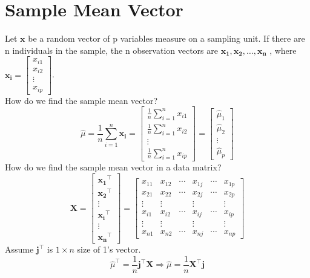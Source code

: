 \documentclass{article}
\begin{document}
\section{Sample Mean Vector}
Let $\mathbf{x}$ be a random vector of p variables measure on a sampling unit. If there are n individuals in the sample, the n observation vectors are $\mathbf{x_1, x_2, \hdots, x_n}$ , where $\mathbf{x_i}=\begin{bmatrix}x_{i1}\\ x_{i2}\\ \vdots \\ x_{ip} \end{bmatrix}$.\\
How do we find the sample mean vector?
\[\hat{\mu}=\frac{1}{n}\sum^n_{i=1}\mathbf{x_i}=
\begin{bmatrix}
\frac{1}{n}\sum^n_{i=1}x_{i1}\\ 
\frac{1}{n}\sum^n_{i=1}x_{i2}\\ 
\vdots \\ 
\frac{1}{n}\sum^n_{i=1}x_{ip}
\end{bmatrix}=
\begin{bmatrix}
\hat{\mu}_1\\ 
\hat{\mu}_2\\ 
\vdots\\ 
\hat{\mu}_p
\end{bmatrix}\]
How do we find the sample mean vector in a data matrix?
\[\mathbf{X} = 
\begin{bmatrix}
\mathbf{x_1}^\intercal \\ 
\mathbf{x_2}^\intercal \\ 
\vdots \\ 
\mathbf{x_i}^\intercal \\ 
\vdots \\ 
\mathbf{x_n}^\intercal 
\end{bmatrix}=
\begin{bmatrix}
x_{11} & x_{12} & \cdots & x_{1j} & \cdots & x_{1p} \\ 
x_{21} & x_{22} & \cdots & x_{2j} & \cdots & x_{2p} \\ 
\vdots & \vdots &  & \vdots & & \vdots \\ 
x_{i1} & x_{i2} & \cdots & x_{ij} & \cdots & x_{ip} \\ 
\vdots & \vdots &  & \vdots & & \vdots \\ 
x_{n1} & x_{n2} & \cdots & x_{nj} & \cdots & x_{np}
\end{bmatrix}\]
Assume $\mathbf{j}^\intercal$ is $1\times n$ size of 1's vector.
\[\hat{\mu}^\intercal=\frac{1}{n}\mathbf{j}^\intercal\mathbf{X}\Rightarrow \hat{\mu}=\frac{1}{n}\mathbf{X}^\intercal\mathbf{j}\]
\end{document}

